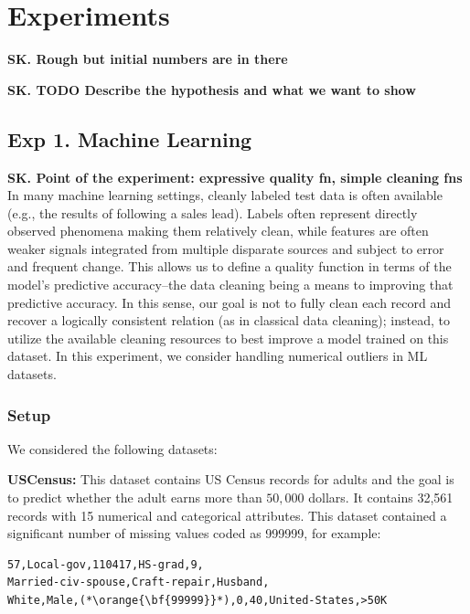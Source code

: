 \section{Experiments}\label{s:exp}
\textbf{SK. Rough but initial numbers are in there}

\textbf{SK. TODO Describe the hypothesis and what we want to show}


\subsection*{Exp 1. Machine Learning}
\textbf{SK. Point of the experiment: expressive quality fn, simple cleaning fns}
In many machine learning settings, cleanly labeled test data is often available (e.g., the results of following a sales lead). 
Labels often represent directly observed phenomena making them relatively clean, while features are often weaker signals integrated from multiple disparate sources and subject to error and frequent change.
This allows us to define a quality function in terms of the model's predictive accuracy--the data cleaning being a means to improving that predictive accuracy.
In this sense, our goal is not to fully clean each record and recover a logically consistent relation (as in classical data cleaning); instead, to utilize the available cleaning resources to best improve a model trained on this dataset. In this experiment, we consider handling numerical outliers in ML datasets.

\subsubsection{Setup}
We considered the following datasets:

\vspace{0.5em}\noindent\textbf{USCensus: } This dataset contains US Census records for adults and the goal is to predict  whether the adult earns more than $50,000$ dollars. It contains 32,561 records with 15 numerical and categorical attributes. This dataset contained a significant number of missing values coded as 999999, for example:
\begin{lstlisting}
57,Local-gov,110417,HS-grad,9,
Married-civ-spouse,Craft-repair,Husband,
White,Male,(*\orange{\bf{99999}}*),0,40,United-States,>50K
\end{lstlisting}

